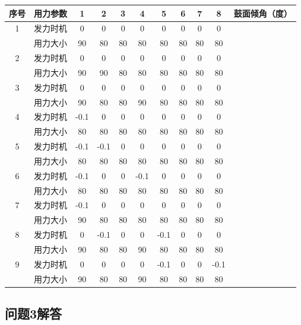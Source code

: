 \documentclass{cumcm}
\begin{document}
\begin{table}[H]
\begin{tabular}{|c|c|c|c|c|c|c|c|c|c|c|}
序号 & 用力参数 & 1    & 2    & 3  & 4    & 5    & 6  & 7  & 8    & 鼓面倾角（度） \\
\hline
1  & 发力时机 & 0    & 0    & 0  & 0    & 0    & 0  & 0  & 0    &         \\
   & 用力大小 & 90   & 80   & 80 & 80   & 80   & 80 & 80 & 80   &         \\
\hline
2  & 发力时机 & 0    & 0    & 0  & 0    & 0    & 0  & 0  & 0    &         \\
   & 用力大小 & 90   & 90   & 80 & 80   & 80   & 80 & 80 & 80   &         \\
\hline
3  & 发力时机 & 0    & 0    & 0  & 0    & 0    & 0  & 0  & 0    &         \\
   & 用力大小 & 90   & 80   & 80 & 90   & 80   & 80 & 80 & 80   &         \\
4  & 发力时机 & -0.1 & 0    & 0  & 0    & 0    & 0  & 0  & 0    &         \\
   & 用力大小 & 80   & 80   & 80 & 80   & 80   & 80 & 80 & 80   &         \\
5  & 发力时机 & -0.1 & -0.1 & 0  & 0    & 0    & 0  & 0  & 0    &         \\
   & 用力大小 & 80   & 80   & 80 & 80   & 80   & 80 & 80 & 80   &         \\
6  & 发力时机 & -0.1 & 0    & 0  & -0.1 & 0    & 0  & 0  & 0    &         \\
   & 用力大小 & 80   & 80   & 80 & 80   & 80   & 80 & 80 & 80   &         \\
7  & 发力时机 & -0.1 & 0    & 0  & 0    & 0    & 0  & 0  & 0    &         \\
   & 用力大小 & 90   & 80   & 80 & 80   & 80   & 80 & 80 & 80   &         \\
8  & 发力时机 & 0    & -0.1 & 0  & 0    & -0.1 & 0  & 0  & 0    &         \\
   & 用力大小 & 90   & 80   & 80 & 90   & 80   & 80 & 80 & 80   &         \\
9  & 发力时机 & 0    & 0    & 0  & 0    & -0.1 & 0  & 0  & -0.1 &         \\
   & 用力大小 & 90   & 80   & 80 & 90   & 80   & 80 & 80 & 80   &        
\end{tabular}
\end{table}

\subsection{问题3解答}
\end{document}
